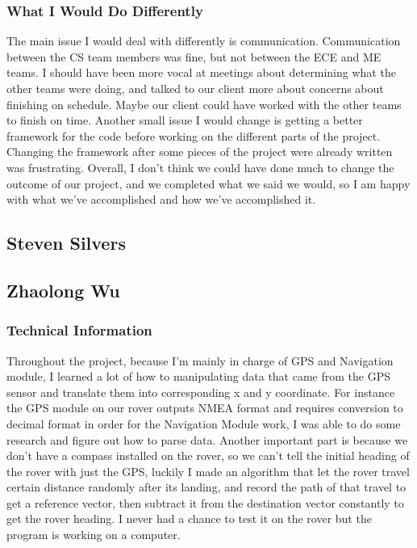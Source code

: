 \documentclass[10pt,letterpaper,onecolumn,draftclsnofoot,journal]{IEEEtran}
\begin{document}
\subsubsection{\textbf{What I Would Do Differently}}
The main issue I would deal with differently is communication. Communication between the CS team members was fine, but not between the ECE and ME teams. I should have been more vocal at meetings about determining what the other teams were doing, and talked to our client more about concerns about finishing on schedule. Maybe our client could have worked with the other teams to finish on time. Another small issue I would change is getting a better framework for the code before working on the different parts of the project. Changing the framework after some pieces of the project were already written was frustrating. Overall, I don't think we could have done much to change the outcome of our project, and we completed what we said we would, so I am happy with what we've accomplished and how we've accomplished it.\vspace{.3cm}

\subsection{\textbf{Steven Silvers}}

\subsection{\textbf{Zhaolong Wu}}
\subsubsection{\textbf{Technical Information}}
Throughout the project, because I'm mainly in charge of GPS and Navigation module, I learned a lot of how to manipulating data that came from the GPS sensor and translate them into corresponding x and y coordinate. For instance the GPS module on our rover outputs NMEA format and requires conversion to decimal format in order for the Navigation Module work, I was able to do some research and figure out how to parse data. Another important part is because we don't have a compass installed on the rover, so we can't tell the initial heading of the rover with just the GPS, luckily I made an algorithm that let the rover travel certain distance randomly after its landing, and record the path of that travel to get a reference vector, then subtract it from the destination vector constantly to get the rover heading. I never had a chance to test it on the rover but the program is working on a computer.     
\vspace{.3cm}
\end{document}
